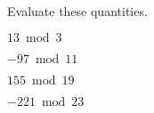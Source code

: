 
%
%
%

	Evaluate these quantities.
	\begin{subproblem}
		\item $13 \bmod 3$
		\item $-97 \bmod 11$
		\item $155 \bmod 19$
		\item $-221 \bmod 23$
	\end{subproblem}

\solution
	\begin{subproblem}
		\item 
		\item 
		\item 
		\item 
	\end{subproblem}
